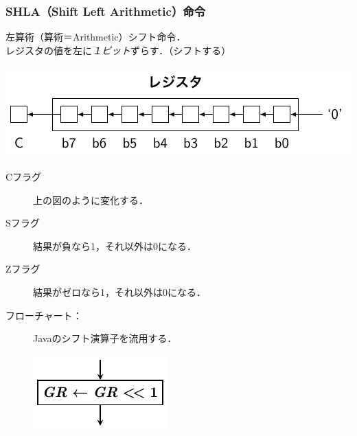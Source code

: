 \documentclass[handout]{beamer}        %
\begin{document}
\begin{frame}
  \frametitle{SHLA（Shift Left Arithmetic）命令}
  左算術（算術＝Arithmetic）シフト命令．\\
  レジスタの値を左に\emph{１ビット}ずらす．（シフトする）\\
  \vfill
  \centerline{\includegraphics[scale=0.7]{../Tikz/shft1.pdf}}
  \vfill
  \begin{description}
  \item[Cフラグ] 上の図のように変化する．
  \item[Sフラグ] 結果が負なら1，それ以外は0になる．
  \item[Zフラグ] 結果がゼロなら1，それ以外は0になる．
    \vfill
  \item[フローチャート：] Javaのシフト演算子を流用する．\\
    \centerline{\includegraphics[scale=0.7]{../Tikz/shla.pdf}}
  \end{description}
  \vfill
\end{frame}
\end{document}
